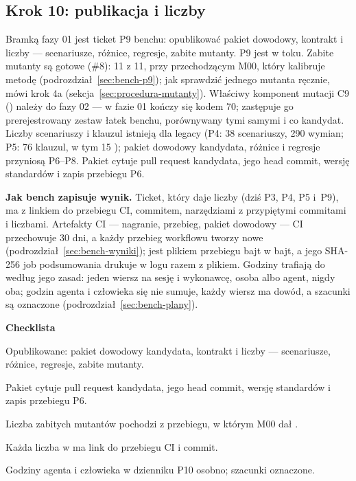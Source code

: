 \subsection{Krok 10: publikacja i liczby}\label{sec:procedura-krok10}

Bramką fazy 01 jest ticket P9 benchu: opublikować pakiet dowodowy, kontrakt i liczby ---
scenariusze, różnice, regresje, zabite mutanty. P9 jest w toku. Zabite mutanty są gotowe
(\#8): 11 z 11, przy przechodzącym M00, który kalibruje metodę
(podrozdział~\ref{sec:bench-p9}); jak sprawdzić jednego mutanta ręcznie, mówi krok 4a
(sekcja~\ref{sec:procedura-mutanty}). Właściwy komponent mutacji C9 ()
należy do fazy 02 --- w fazie 01 kończy się kodem 70; zastępuje go prerejestrowany zestaw
łatek benchu, porównywany tymi samymi  i  co
kandydat. Liczby scenariuszy i klauzul istnieją dla legacy (P4: 38 scenariuszy, 290
wymian; P5: 76 klauzul, w tym 15 ); pakiet dowodowy kandydata, różnice
i regresje przyniosą P6--P8. Pakiet cytuje pull request kandydata, jego head commit,
wersję standardów i zapis przebiegu P6.

\textbf{Jak bench zapisuje wynik.} Ticket, który daje liczby (dziś P3, P4, P5 i~P9), ma
 z linkiem do przebiegu CI, commitem, narzędziami
z przypiętymi commitami i liczbami. Artefakty CI --- nagranie, przebieg, pakiet dowodowy ---
CI przechowuje 30 dni, a każdy przebieg workflowu tworzy nowe
(podrozdział~\ref{sec:bench-wyniki});  jest plikiem przebiegu
bajt w bajt, a jego SHA-256 job podsumowania drukuje w logu razem z plikiem. Godziny trafiają
do  według jego zasad: jeden wiersz na sesję
i wykonawcę, osoba albo agent, nigdy oba; godzin agenta i człowieka się nie sumuje, każdy
wiersz ma dowód, a szacunki są oznaczone (podrozdział~\ref{sec:bench-plany}).

\textbf{Checklista}
\begin{checklista}
  \item Opublikowane: pakiet dowodowy kandydata, kontrakt i liczby --- scenariusze, różnice,
        regresje, zabite mutanty.
  \item Pakiet cytuje pull request kandydata, jego head commit, wersję standardów i zapis
        przebiegu P6.
  \item Liczba zabitych mutantów pochodzi z przebiegu, w którym M00 dał .
  \item Każda liczba w  ma link do przebiegu CI i commit.
  \item Godziny agenta i człowieka w dzienniku P10 osobno; szacunki oznaczone.
\end{checklista}

